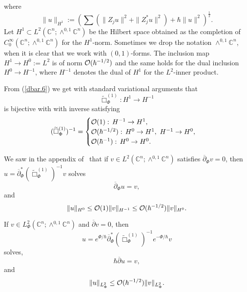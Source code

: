 \documentclass{article}
\newcommand{\CM}{\mathbb{C}}
\newcommand{\h}{\hbar}
\begin{document}
where
\begin{equation}\label{dbar.7}
  \| u \|_{H^1}:=\left( \sum\left( \| Z_ju\| ^2 +\| Z^*_ju\|
      ^2\right)+\h \| u\|^2 \right)^{\frac{1}{2}}.
\end{equation}
Let $H^1\subset L^2(\CM^n;\wedge^{0,1}\CM^n)$ be the Hilbert space
obtained as the completion of
$ C_0^\infty (\CM^n;\wedge ^{0,1}\CM^{n})$ for the
$H^1$-norm. Sometimes we drop the notation $\wedge^{0,1}\CM^n$, when
it is clear that we work with $(0,1)$-forms. The inclusion map
$H^1\to H^0:=L^2$ is of norm ${\cal O}(\h^{-1/2})$ and the same holds
for the dual inclusion $H^0\to H^{-1}$, where $H^{-1}$ denotes the
dual of $H^1$ for the $L^2$-inner product.

\par From (\ref{dbar.6}) we get with standard variational arguments
that
\begin{equation}\label{dbar.8}
  \widetilde{\Box}_\Phi ^{(1)}:H^1\to H^{-1}
\end{equation}
is bijective with with inverse satisfying
\begin{equation}\label{dbar.9}
  (\widetilde{\Box}_\Phi ^{(1)})^{-1}=\begin{cases}
    {\cal O}(1):\, H^{-1}\to H^1,\\
    {\cal O}(\h ^{-1/2}):\, H^0\to H^1,\ H^{-1}\to H^0,\\
    {\cal O}(\h ^{-1}):\, H^0\to H^0.
  \end{cases}
\end{equation}

\par We saw in the appendix of~\cite{sj-96} that if
$v\in L^2(\CM^n;\wedge^{0,1}\CM^n)$ satisfies
$\overline{\partial }_\Phi v=0$, then
$u=\overline{\partial }^*_{\Phi }(\widetilde{\Box}_\Phi ^{(1)})^{-1}v$
solves
\begin{equation}\label{dbar.10}
  \overline{\partial }_\Phi u=v,
\end{equation}
and
\begin{equation}\label{dbar.11}
  \| u\|_{H^0}\le {\cal O}(1)\| v\|_{H^{-1}}\le {\cal O}(\h ^{-1/2})\| v\|_{H^0}.
\end{equation}

\par If $v\in L^2_\Phi (\CM^n;\wedge^{0,1}\CM^n)$ and
$\overline{\partial }v=0$, then
\[
u=e^{\Phi /\h }\overline{\partial }_\Phi ^*(\widetilde{\Box}_{\Phi
}^{(1)})^{-1}e^{-\Phi /\h }v
\]
solves,
\begin{equation}\label{dbar.12}
  \h \overline{\partial }u=v,
\end{equation}
and
\begin{equation}\label{dbar.13}
  \| u\|_{L^2_\Phi }\le {\cal O}(\h ^{-1/2})\| v\|_{L^2_\Phi }.
\end{equation}
\end{document}

